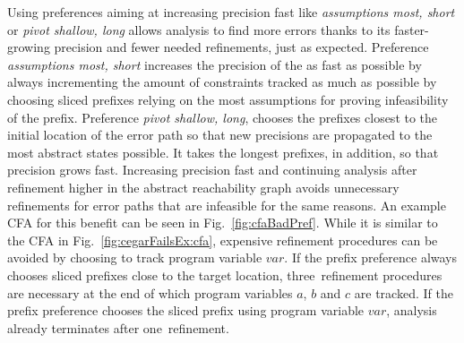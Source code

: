 Using preferences aiming at increasing precision fast like \emph{assumptions most, short} or \emph{pivot shallow, long} allows analysis to find more errors thanks to its faster-growing precision and fewer needed refinements, just as expected.
Preference \emph{assumptions most, short} increases the precision of the \constraintsCPA as fast as possible by always incrementing the amount of constraints tracked as much as possible by choosing sliced prefixes relying on the most assumptions for proving infeasibility of the prefix.
Preference \emph{pivot shallow, long}, chooses the prefixes closest to the initial location of the error path so that new precisions are propagated to the most abstract states possible. It takes the longest prefixes, in addition, so that precision grows fast.
Increasing precision fast and continuing analysis after refinement higher in the abstract reachability graph avoids unnecessary refinements for error paths that are infeasible for the same reasons.
An example CFA for this benefit can be seen in Fig.~\ref{fig:cfaBadPref}.
While it is similar to the CFA in Fig.~\ref{fig:cegarFailsEx:cfa}, expensive refinement procedures can be avoided by choosing to track program variable $var$.
If the prefix preference always chooses sliced prefixes close to the target location, three~refinement procedures are necessary at the end of which program variables $a$, $b$ and $c$ are tracked.
If the prefix preference chooses the sliced prefix using program variable $var$, analysis already terminates after one~refinement.

